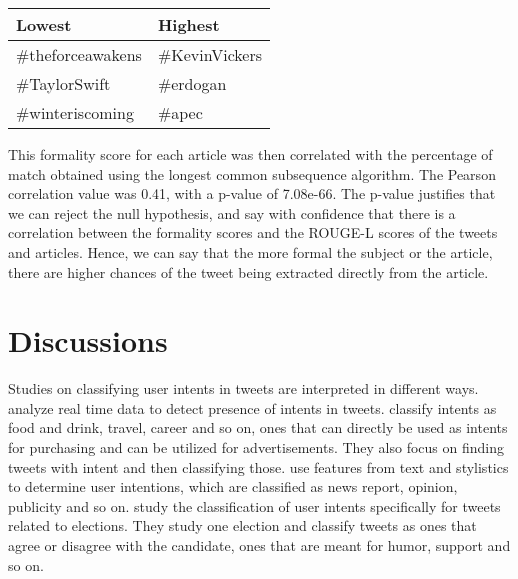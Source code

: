 \begin{table}[htbp]
\centering
\begin{tabular}{|l|l|}
\hline
Lowest  & Highest  \\ \hline
\#theforceawakens       & \#KevinVickers           \\
\#TaylorSwift           & \#erdogan                \\
\#winteriscoming        & \#apec                  \\ \hline
\end{tabular}
\label{tab:formal}
\end{table}

This formality score for each article was then correlated with the percentage of match obtained using the longest common subsequence algorithm. The Pearson correlation value was 0.41, with a p-value of 7.08e-66. The p-value justifies that we can reject the null hypothesis, and say with confidence that there is a correlation between the formality scores and the ROUGE-L scores of the tweets and articles. Hence, we can say that the more formal the subject or the article, there are higher chances of the tweet being extracted directly from the article.

\section{Discussions}

Studies on classifying user intents in tweets are interpreted in different ways.  analyze real time data to detect presence of intents in tweets.  classify intents as food and drink, travel, career and so on, ones that can directly be used as intents for purchasing and can be utilized for advertisements. They also focus on finding tweets with intent and then classifying those.  use features from text and stylistics to determine user intentions, which are classified as news report, opinion, publicity and so on.  study the classification of user intents specifically for tweets related to elections. They study one election and classify tweets as ones that agree or disagree with the candidate, ones that are meant for humor, support and so on. 
